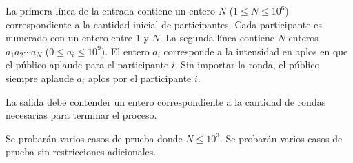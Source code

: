 \documentclass{oci}
\begin{document}
\begin{inputDescription}
La primera línea de la entrada contiene un entero $N$
($1 \leq N \leq 10^6$) correspondiente a la cantidad
inicial de participantes.
%
Cada participante es numerado con un entero entre $1$ y $N$.
%
La segunda línea contiene $N$ enteros $a_1 a_2 \cdots a_N$ ($0 \leq a_i \leq 10^9$).
%
El entero $a_i$ corresponde a la intensidad en aplos en que el público
aplaude para el participante $i$.
%
Sin importar la ronda, el público siempre aplaude $a_i$ aplos por el participante
$i$.
\end{inputDescription}

\begin{outputDescription}
La salida debe contender un entero correspondiente a la cantidad de rondas
necesarias para terminar el proceso.
\end{outputDescription}

\begin{scoreDescription}
   Se probarán varios casos de prueba donde $N \leq 10^3$.
   Se probarán varios casos de prueba sin restricciones adicionales.
\end{scoreDescription}
\end{document}
